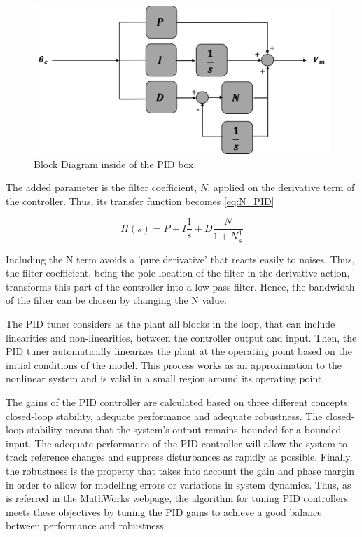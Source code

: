 \begin{figure}[H]
\centering
\includegraphics[scale=0.6]{figures/controller_box.png}
\caption{Block Diagram inside of the PID box.}
\label{PID_box_N}
\end{figure}

The added parameter is the filter coefficient, \textit{N}, applied on the derivative term of the controller. Thus, its transfer function becomes \ref{eq:N_PID}

\begin{equation}\label{eq:N_PID}
H(s) = P + I\frac{1}{s} + D\frac{N}{1+N\frac{1}{s}}
\end{equation}

Including the N term avoids a 'pure derivative' that reacts easily to noises. Thus, the filter coefficient, being the pole location of the filter in the derivative action, transforms this part of the controller into a low pass filter. Hence, the bandwidth of the filter can be chosen by changing the N value.\par

\vspace{5mm}


The PID tuner considers as the plant all blocks in the loop, that can include linearities and non-linearities, between the controller output and input. Then, the PID tuner automatically linearizes the plant at the operating point based on the initial conditions of the model. This process works as an approximation to the nonlinear system and is valid in a small region around its operating point.\par

The gains of the PID controller are calculated based on three different concepts: closed-loop stability, adequate performance and adequate robustness. The closed-loop stability means that the system’s output remains bounded for a bounded input. The adequate performance of the PID controller will allow the system to track reference changes and suppress disturbances as rapidly as possible. Finally, the robustness is the property that takes into account the gain and phase margin in order to allow for modelling errors or variations in system dynamics. Thus, as is referred in the MathWorks webpage, the algorithm for tuning PID controllers meets these objectives by tuning the PID gains to achieve a good balance between performance and robustness.



